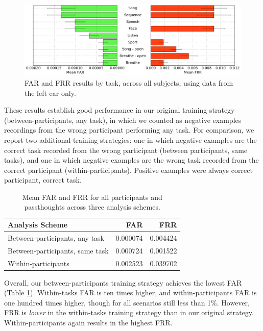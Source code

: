 \documentclass{sigchi}
\begin{document}
\begin{figure}[t]
\centering
\includegraphics[width=.9\linewidth]{./figures/mean-far-and-frr-by-task.png}
\caption{FAR and FRR results by task, across all subjects, using data from the left ear only.}
\label{fig:meanByTask}
\end{figure}

These results establish good performance in our original training strategy (between-participants, any task), in which we counted as negative examples recordings from the wrong participant performing any task. For comparison, we report two additional training strategies: one in which negative examples are the correct task recorded from the wrong participant (between participants, same tasks), and one in which negative examples are the wrong task recorded from the correct participant (within-participants). Positive examples were always correct participant, correct task.

\begin{table}[h]
\begin{center}
\begin{tabular}{lrr}
 \textbf{Analysis Scheme} & \textbf{FAR} & \textbf{FRR}\\
\hline
Between-participants, any task & 0.000074 & 0.004424\\
Between-participants, same task & 0.000724 & 0.001522\\
Within-participants & 0.002523 & 0.039702\\
\hline
\end{tabular}
\end{center}
\caption{Mean FAR and FRR for all participants and passthoughts across three analysis schemes.}
\label{tab:compare}
\end{table}

Overall, our between-participants training strategy achieves the lowest FAR (Table \ref{tab:compare}). Within-tasks FAR is ten times higher, and within-participants FAR is one hundred times higher, though for all scenarios still less than 1\%.
However, FRR is \textit{lower} in the within-tasks training strategy than in our original strategy. Within-participants again results in the highest FRR.
\end{document}
